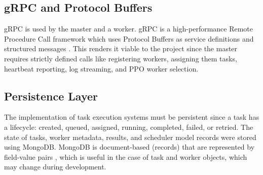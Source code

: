 \subsection{gRPC and Protocol Buffers}

gRPC is used by the master and a worker. gRPC is a high-performance Remote Procedure Call framework which uses Protocol Buffers as service definitions and structured messages \cite{grpcintro}. This renders it viable to the project since the master requires strictly defined calls like registering workers, assigning them tasks, heartbeat reporting, log streaming, and PPO worker selection.

\subsection{Persistence Layer}

The implementation of task execution systems must be persistent since a task has a lifecycle: created, queued, assigned, running, completed, failed, or retried. The state of tasks, worker metadata, results, and scheduler model records were stored using MongoDB. MongoDB is document-based (records) that are represented by field-value pairs \cite{mongodbdocs}, which is useful in the case of task and worker objects, which may change during development.
